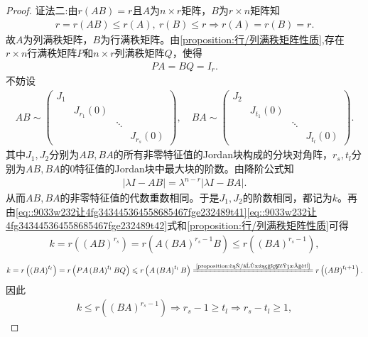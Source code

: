 \documentclass[../../main.tex]{subfiles}%
\begin{document}
\begin{proof}
{\color{blue}证法二:}由$r(AB) = r$且$A$为$n \times r$矩阵，$B$为$r \times n$矩阵知
\begin{align*}
r = r(AB) \leqslant r(A),\ r(B) \leqslant r \Longrightarrow r(A) = r(B) = r.
\end{align*}
故$A$为列满秩矩阵，$B$为行满秩矩阵。由\cref{proposition:行/列满秩矩阵性质},存在$r \times n$行满秩矩阵$P$和$n \times r$列满秩矩阵$Q$，使得
\begin{align}
PA = BQ = I_r. \label{eq::9033w232让4fg343445364558685467fge232489t41}
\end{align}
不妨设
\begin{align}
AB \sim \begin{pmatrix}
J_1 & & & \\
& J_{r_1}(0) & & \\
& & \ddots & \\
& & & J_{r_s}(0)
\end{pmatrix},\quad BA \sim \begin{pmatrix}
J_2 & & & \\
& J_{t_1}(0) & & \\
& & \ddots & \\
& & & J_{t_l}(0)
\end{pmatrix}. \label{eq::9033w232让4fg343445364558685467fge232489t42}
\end{align}
其中$J_1,J_2$分别为$AB,BA$的所有非零特征值的Jordan块构成的分块对角阵，$r_s,t_l$分别为$AB,BA$的$0$特征值的Jordan块中最大块的阶数。由降阶公式知
\begin{align*}
\left| \lambda I - AB \right| = \lambda^{n - r} \left| \lambda I - BA \right|.
\end{align*}
从而$AB,BA$的非零特征值的代数重数相同。于是$J_1,J_2$的阶数相同，都记为$k$。再由\eqref{eq::9033w232让4fg343445364558685467fge232489t41}\eqref{eq::9033w232让4fg343445364558685467fge232489t42}式和\cref{proposition:行/列满秩矩阵性质}可得
\begin{align*}
k = r\left( \left( AB \right)^{r_s} \right) = r\left( A\left( BA \right)^{r_s - 1}B \right) \leqslant r\left( \left( BA \right)^{r_s - 1} \right),
\end{align*}
\begin{align*}
k = r\left( \left( BA \right)^{t_l} \right) = r\left( PA\left( BA \right)^{t_l}BQ \right) \leqslant r\left( A\left( BA \right)^{t_l}B \right) \xlongequal{\text{\cref{proposition:行/列满秩矩阵性质}}} r\left( \left( AB \right)^{t_l + 1} \right).
\end{align*}
因此
\begin{align*}
k \leqslant r\left( \left( BA \right)^{r_s - 1} \right) \Longrightarrow r_s - 1 \geqslant t_l \Longrightarrow r_s - t_l \geqslant 1,

\end{align*}
\end{proof}
\end{document}
